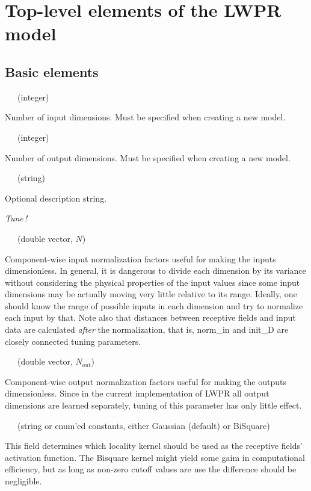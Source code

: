 \documentclass[11pt,a4paper]{article}
\newenvironment{element}[2]%
{{\large\sf #1}~~~(#2)\begin{list}{}%
{\setlength{\leftmargin}{0.5cm}\setlength{\topsep}{0.2cm}}%
\item[]%
}
{\end{list}}
\newcommand{\tune}{\hspace*{-1.5cm}\parbox{1.5cm}{\emph{Tune\,!}}}
\begin{document}
\section{Top-level elements of the LWPR model}
\subsection{Basic elements}

\begin{element}{nIn}{integer}
Number of input dimensions. Must be specified when creating a new model.
\end{element}

\begin{element}{nOut}{integer}
Number of output dimensions. Must be specified when creating a new model.
\end{element}

\begin{element}{name}{string}
Optional description string.
\end{element}

\tune\begin{element}{norm\_in}{double vector, $N$}
Component-wise
input normalization factors useful for making the inputs
dimensionless. In general, it is dangerous to divide each
dimension by its variance without considering the physical
properties of the input values since some input dimensions
may be actually moving very little relative to its range. 
Ideally, one should know the range of possible inputs in each
dimension and try to normalize each input by that. Note also
that distances between receptive fields and input data are
calculated \emph{after} the normalization, that is, {\sf norm\_in}
and {\sf init\_D} are closely connected tuning parameters.
\end{element}

\begin{element}{norm\_out}{double vector, $N_{out}$}
Component-wise
output normalization factors useful for making the outputs
dimensionless. Since in the current implementation of LWPR
all output dimensions are learned separately, tuning of this
parameter has only little effect.
\end{element}

\begin{element}{kernel}{string or enum'ed constants, either 
Gaussian (default) or BiSquare}
This field determines which locality kernel should be used as
the receptive fields' activation function. The Bisquare kernel
might yield some gaim in computational efficiency, but as long
as non-zero {\sf cutoff} values are use the difference should
be negligible.
\end{element}
\end{document}

